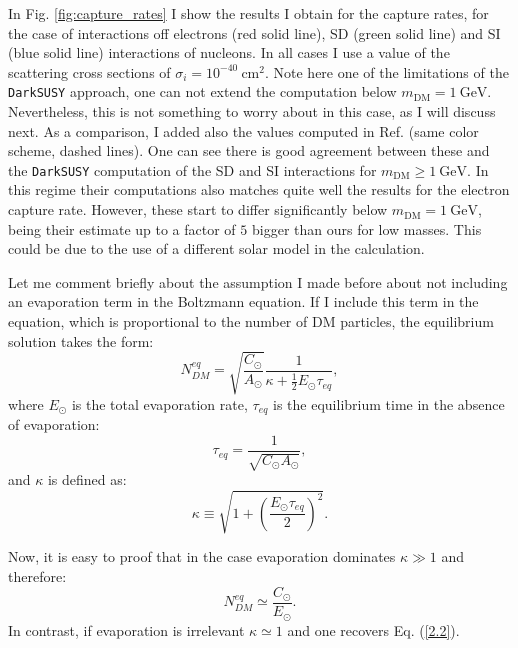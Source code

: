 In Fig. \ref{fig:capture_rates} I show the results I obtain for the capture rates, for the case of interactions off electrons (red solid line), SD (green solid line) and SI (blue solid line) interactions of nucleons. In all cases I use a value of the scattering cross sections of $\sigma_{i} = 10^{-40} \ \mathrm{cm}^{2}$. Note here one of the limitations of the \texttt{DarkSUSY} approach, one can not extend the computation below $m_{\mathrm{DM}} = 1 \ \mathrm{GeV}$. Nevertheless, this is not something to worry about in this case, as I will discuss next. As a comparison, I added also the values computed in Ref. \cite{Palomares2017} (same color scheme, dashed lines). One can see there is good agreement between these and the \texttt{DarkSUSY} computation of the SD and SI interactions for $m_{\mathrm{DM}} \geq 1 \ \mathrm{GeV}$. In this regime their computations also matches quite well the results for the electron capture rate. However, these start to differ significantly below $m_{\mathrm{DM}} = 1 \ \mathrm{GeV}$, being their estimate up to a factor of $5$ bigger than ours for low masses. This could be due to the use of a different solar model in the calculation.

Let me comment briefly about the assumption I made before about not including an evaporation term in the Boltzmann equation. If I include this term in the equation, which is proportional to the number of DM particles, the equilibrium solution takes the form:
\begin{equation}\label{2.17}
	N_{DM}^{eq} = \sqrt{\frac{C_{\odot}}{A_{\odot}}} \frac{1}{\kappa + \frac{1}{2} E_{\odot} \tau_{eq}},
\end{equation}
where $E_{\odot}$ is the total evaporation rate, $\tau_{eq}$ is the equilibrium time in the absence of evaporation:
\begin{equation}\label{2.18}
	\tau_{eq} = \frac{1}{\sqrt{C_{\odot} A_{\odot}}},
\end{equation}
and $\kappa$ is defined as:
\begin{equation}\label{2.19}
	\kappa \equiv \sqrt{1+\left(\frac{E_{\odot}\tau_{eq}}{2}\right)^{2}}.
\end{equation}

Now, it is easy to proof that in the case evaporation dominates $\kappa \gg 1$ and therefore:
\begin{equation}\label{2.20}
	N_{DM}^{eq} \simeq \frac{C_{\odot}}{E_{\odot}}.
\end{equation}
In contrast, if evaporation is irrelevant $\kappa \simeq 1$ and one recovers Eq. (\ref{2.2}).

